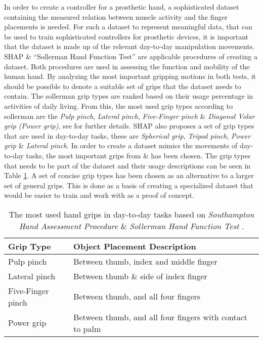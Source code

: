 \documentclass[../main.tex]{subfiles}
\begin{document}
In order to create a controller for a prosthetic hand, a sophisticated dataset containing the measured relation between muscle activity and the finger placements is needed.
For such a dataset to represent meaningful data, that can be used to train sophisticated controllers for prosthetic devices, it is important that the dataset is made up of the relevant day-to-day manipulation movements.
\gls{SHAP} \cite{shap} \& ``Sollerman Hand  Function Test''  \cite{sollerman} are applicable procedures of creating a dataset.
Both procedures are used in assessing the function and mobility of the human hand.
By analyzing the most important gripping motions in both tests, it should be possible to denote a suitable set of grips that the dataset needs to contain.
The sollerman grip types are ranked based on their usage percentage in activities of daily living.
From this, the most used grip types according to sollerman are the \textit{Pulp pinch}, \textit{Lateral pinch}, \textit{Five-Finger pinch} \& \textit{Diagonal Volar grip (Power grip)}, see \cite{sollerman} for further details.
SHAP also proposes a set of grip types that are used in day-to-day tasks, these are \textit{Spherical grip}, \textit{Tripod pinch}, \textit{Power grip} \& \textit{Lateral pinch}.
In order to create a dataset mimics the movements of day-to-day tasks, the most important grips from \cite{sollerman} \& \cite{shap} has been chosen.
The grip types that needs to be part of the dataset and their usage descriptions can be seen in Table \ref{tab:grips}.
A set of concise grip types has been chosen as an alternative to a larger set of general grips.
This is done as a basis of creating a specialized dataset that would be easier to train and work with as a proof of concept.

\begin{table}[H]
\begin{center}
\begin{tabular}{ |l|l| } 
 \hline
 Grip Type & Object Placement Description \\ 
 \hline
 Pulp pinch & Between thumb, index and middle finger \\ 
 Lateral pinch & Between thumb \& side of index finger \\ 
 Five-Finger pinch & Between thumb, and all four fingers \\ 
 Power grip & Between thumb, and all four fingers with contact to palm \\ 
 \hline
\end{tabular}
\caption{The most used hand grips in day-to-day tasks based on \textit{Southampton Hand Assessment Procedure} \cite{shap} \& \textit{Sollerman Hand Function Test} \cite{sollerman}.}
\label{tab:grips}
\end{center}
\end{table}
\end{document}
